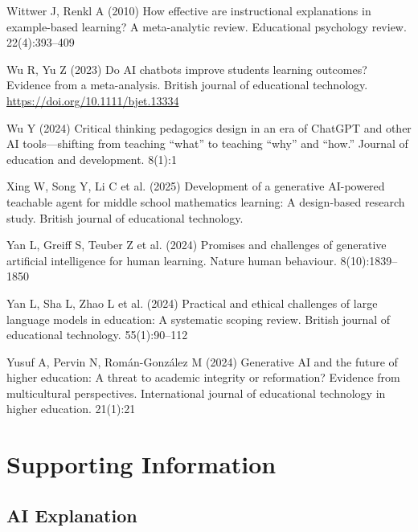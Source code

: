 \documentclass[
  11pt,
]{article}
\newlength{\cslhangindent}
\newenvironment{CSLReferences}[2] %
 {\begin{list}{}{%
  \setlength{\itemindent}{0pt}
  \setlength{\leftmargin}{0pt}
  \setlength{\parsep}{0pt}
  \ifodd #1
   \setlength{\leftmargin}{\cslhangindent}
   \setlength{\itemindent}{-1\cslhangindent}
  \fi
  \setlength{\itemsep}{#2\baselineskip}}}
 {\end{list}}
\begin{document}
\begin{CSLReferences}{1}{0}
Wittwer J, Renkl A (2010) How effective are instructional explanations in example-based learning? A meta-analytic review. Educational psychology review. 22(4):393--409

Wu R, Yu Z (2023) Do AI chatbots improve students learning outcomes? Evidence from a meta-analysis. British journal of educational technology. \url{https://doi.org/10.1111/bjet.13334}

Wu Y (2024) Critical thinking pedagogics design in an era of ChatGPT and other AI tools---shifting from teaching {``what''} to teaching {``why''} and {``how.''} Journal of education and development. 8(1):1

Xing W, Song Y, Li C et al. (2025) Development of a generative AI-powered teachable agent for middle school mathematics learning: A design-based research study. British journal of educational technology.

Yan L, Greiff S, Teuber Z et al. (2024) Promises and challenges of generative artificial intelligence for human learning. Nature human behaviour. 8(10):1839--1850

Yan L, Sha L, Zhao L et al. (2024) Practical and ethical challenges of large language models in education: A systematic scoping review. British journal of educational technology. 55(1):90--112

Yusuf A, Pervin N, Román-González M (2024) Generative AI and the future of higher education: A threat to academic integrity or reformation? Evidence from multicultural perspectives. International journal of educational technology in higher education. 21(1):21

\end{CSLReferences}

\clearpage
\processdelayedfloats
\clearpage
\appendix
\setcounter{table}{0}
\setcounter{figure}{0}
\renewcommand{\thetable}{A\arabic{table}}
\renewcommand{\thefigure}{A\arabic{figure}}

\section{Supporting Information}\label{supporting-information}

\subsection{AI Explanation}\label{sec:si-ai-explanation}
\end{document}
